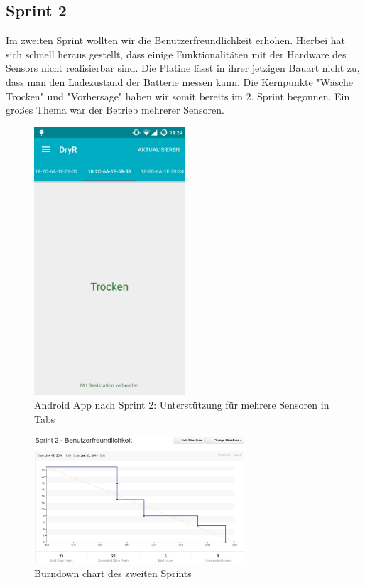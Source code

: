 	\subsection{Sprint 2}
		Im zweiten Sprint wollten wir die Benutzerfreundlichkeit erhöhen.
			Hierbei hat sich schnell heraus gestellt, dass einige Funktionalitäten mit der Hardware des Sensors nicht realisierbar sind. Die Platine lässt in ihrer jetzigen Bauart nicht zu, dass man den Ladezustand der Batterie messen kann. Die Kernpunkte "Wäsche Trocken" und "Vorhersage" haben wir somit bereits im 2. Sprint begonnen. Ein großes Thema war der Betrieb mehrerer Sensoren.
			\begin{figure}[htb] 
				\centerline{\includegraphics[width=0.5\textwidth]{laundry_status_multiple_sensors.png}}
				\caption{Android App nach Sprint 2: Unterstützung für mehrere Sensoren in Tabs}
				\label{screenshot_sprint_2_laundry_status}
			\end{figure}
			\begin{figure}[htb] 
				\centerline{\includegraphics[width=0.7\textwidth]{burndown_sprint2.jpg}}
				\caption{Burndown chart des zweiten Sprints}
				\label{screenshot_sprint_2_burndown}
			\end{figure}
			\clearpage
			

